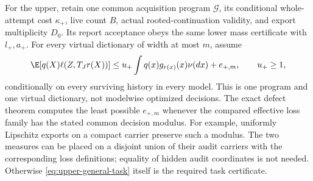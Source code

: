 For the upper, retain one common acquisition program $\mathcal G$, its conditional whole-attempt cost $\kappa_+$, live count $B$, actual rooted-continuation validity, and export multiplicity $D_0$. Its report acceptance obeys the same lower mass certificate with $l_+,a_+$. For every virtual dictionary of width at most $m$, assume
\begin{equation}\label{eq:upper-general-task}
 \E[q(X)\ell(Z,T_Jr(X))]
 \le u_+\int q(x)g_{r(x)}(x)\nu(dx)+e_{+,m},
 \qquad u_+\ge1,
\end{equation}
conditionally on every surviving history in every model. This is one program and one virtual dictionary, not modelwise optimized decisions. The exact defect theorem computes the least possible $e_{+,m}$ whenever the compared effective loss family has the stated common decision modulus. For example, uniformly Lipschitz exports on a compact carrier preserve such a modulus. The two measures can be placed on a disjoint union of their audit carriers with the corresponding loss definitions; equality of hidden audit coordinates is not needed. Otherwise \eqref{eq:upper-general-task} itself is the required task certificate.


